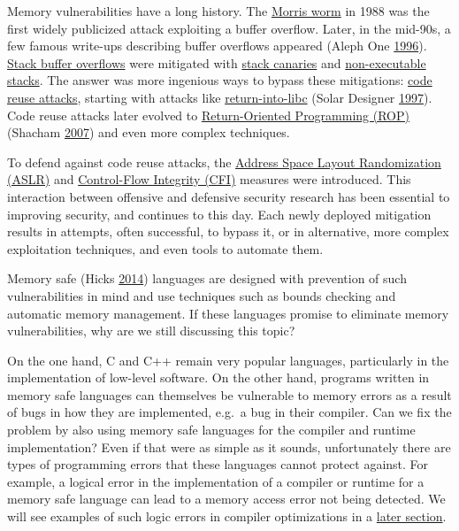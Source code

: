 \documentclass[a4paper,]{report}
\begin{document}
Memory vulnerabilities have a long history. The
\href{https://en.wikipedia.org/wiki/Morris_worm}{Morris worm} in 1988
was the first widely publicized attack exploiting a buffer overflow.
Later, in the mid-90s, a few famous write-ups describing buffer
overflows appeared (Aleph One
\protect\hyperlink{ref-AlephOne1996}{1996}).
\protect\hyperlink{stack-buffer-overflows}{Stack buffer overflows} were
mitigated with \protect\hyperlink{stack-buffer-overflows}{stack
canaries} and \protect\hyperlink{stack-buffer-overflows}{non-executable
stacks}. The answer was more ingenious ways to bypass these mitigations:
\protect\hyperlink{code-reuse-attacks}{code reuse attacks}, starting
with attacks like
\protect\hyperlink{code-reuse-attacks}{return-into-libc} (Solar Designer
\protect\hyperlink{ref-Solar1997}{1997}). Code reuse attacks later
evolved to
\protect\hyperlink{return-oriented-programming}{Return-Oriented
Programming (ROP)} (Shacham \protect\hyperlink{ref-Shacham2007}{2007})
and even more complex techniques.

To defend against code reuse attacks, the
\protect\hyperlink{aslr}{Address Space Layout Randomization (ASLR)} and
\protect\hyperlink{cfi}{Control-Flow Integrity (CFI)} measures were
introduced. This interaction between offensive and defensive security
research has been essential to improving security, and continues to this
day. Each newly deployed mitigation results in attempts, often
successful, to bypass it, or in alternative, more complex exploitation
techniques, and even tools to automate them.

Memory safe (Hicks \protect\hyperlink{ref-Hicks2014}{2014}) languages
are designed with prevention of such vulnerabilities in mind and use
techniques such as bounds checking and automatic memory management. If
these languages promise to eliminate memory vulnerabilities, why are we
still discussing this topic?

On the one hand, C and C++  remain very popular
languages, particularly in the implementation of low-level software. On
the other hand, programs written in memory safe languages can themselves
be vulnerable to memory errors as a result of bugs in how they are
implemented, e.g.~a bug in their compiler. Can we fix the problem by
also using memory safe languages for the compiler and runtime
implementation? Even if that were as simple as it sounds, unfortunately
there are types of programming errors that these languages cannot
protect against. For example, a logical error in the implementation of a
compiler or runtime for a memory safe language can lead to a memory
access error not being detected. We will see examples of such logic
errors in compiler optimizations in a
\protect\hyperlink{jit-compiler-vulnerabilities}{later section}.
\end{document}
